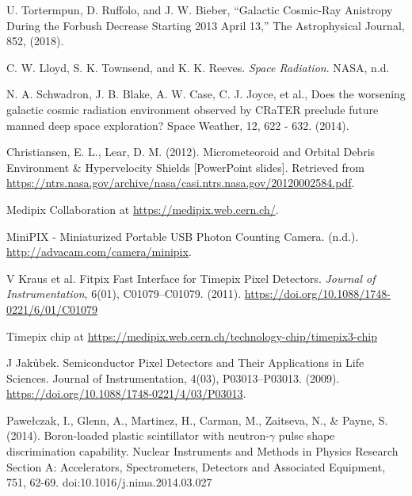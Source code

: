 \begin{thebibliography}{9}
  U. Tortermpun, D. Ruffolo, and J. W. Bieber, “Galactic Cosmic-Ray Anistropy During the Forbush Decrease Starting 2013 April 13,” The Astrophysical Journal, 852, (2018).

  C. W. Lloyd, S. K. Townsend, and K. K. Reeves. \textit{Space Radiation}. NASA, n.d.

  N. A. Schwadron, J. B. Blake, A. W. Case, C. J. Joyce, et al., Does the worsening galactic cosmic radiation environment observed by CRaTER preclude future manned deep space exploration? Space Weather, 12, 622 - 632. (2014).

  Christiansen, E. L., Lear, D. M. (2012). Micrometeoroid and Orbital Debris Environment \& Hypervelocity Shields [PowerPoint slides]. Retrieved from \url{https://ntrs.nasa.gov/archive/nasa/casi.ntrs.nasa.gov/20120002584.pdf}.

  Medipix Collaboration at \url{https://medipix.web.cern.ch/}.

  MiniPIX - Miniaturized Portable USB Photon Counting Camera. (n.d.). \url{http://advacam.com/camera/minipix}.

  V Kraus et al. Fitpix Fast Interface for Timepix Pixel Detectors. \textit{Journal of Instrumentation}, 6(01), C01079–C01079. (2011). \url{https://doi.org/10.1088/1748-0221/6/01/C01079}

  Timepix chip at \url{https://medipix.web.cern.ch/technology-chip/timepix3-chip}

  J Jakůbek. Semiconductor Pixel Detectors and Their Applications in Life Sciences. Journal of Instrumentation, 4(03), P03013–P03013. (2009). \url{https://doi.org/10.1088/1748-0221/4/03/P03013}.

  

  Pawełczak, I., Glenn, A., Martinez, H., Carman, M., Zaitseva, N., \& Payne, S. (2014). Boron-loaded plastic scintillator with neutron-$\gamma$ pulse shape discrimination capability. Nuclear Instruments and Methods in Physics Research Section A: Accelerators, Spectrometers, Detectors and Associated Equipment, 751, 62-69. doi:10.1016/j.nima.2014.03.027


\end{thebibliography}
